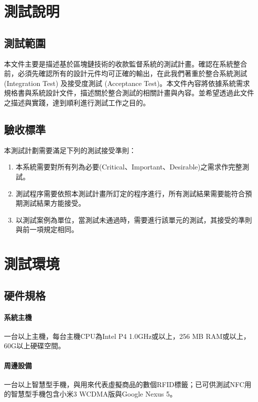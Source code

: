  	\section{測試說明}

 	\subsection{測試範圍}
 	本文件主要是描述基於區塊鏈技術的收款監督系統的測試計畫。確認在系統整合前，必須先確認所有的設計元件均可正確的輸出，在此我們著重於整合系統測試 (Integration Test) 及接受度測試 (Acceptance Test)。本文件內容將依據系統需求規格書與系統設計文件，描述關於整合測試的相關計畫與內容。並希望透過此文件之描述與實踐，達到順利進行測試工作之目的。

 	\subsection{驗收標準}
 	本測試計劃需要滿足下列的測試接受準則： 

 	\begin{enumerate}
		\item 本系統需要對所有列為必要(Critical、Important、Desirable)之需求作完整測試。
		\item 測試程序需要依照本測試計畫所訂定的程序進行，所有測試結果需要能符合預期測試結果方能接受。
		\item 以測試案例為單位，當測試未通過時，需要進行該單元的測試，其接受的準則與前一項規定相同。 
	\end{enumerate}
 	
 	\section{測試環境}

 		\subsection{硬件規格}
 			\paragraph{系統主機}一台以上主機，每台主機CPU為Intel P4 1.0GHz或以上，256 MB RAM或以上，60G以上硬碟空間。
 			\paragraph{周邊設備}一台以上智慧型手機，與用來代表虛擬商品的數個RFID標籤；已可供測試NFC用的智慧型手機包含小米3 WCDMA版與Google Nexus 5。

